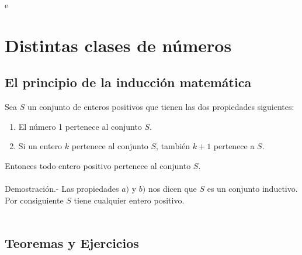 e\chapter{Distintas clases de números}
\section{El principio de la inducción matemática}
\begin{teo}
Sea $S$ un conjunto de enteros positivos que tienen las dos propiedades siguientes:
\begin{enumerate}[\bfseries a)]
\item El número 1 pertenece al conjunto $S$.
\item Si un entero $k$ pertenece al conjunto $S$, también $k+1$ pertenece a $S$.
\end{enumerate}
Entonces todo entero positivo pertenece al conjunto $S$.\\\\
Demostración.- \; Las propiedades $a)$ y $b)$ nos dicen que $S$ es un conjunto inductivo. Por consiguiente $S$ tiene cualquier entero positivo.\\\\ 
\end{teo}

\section{Teoremas y Ejercicios}
